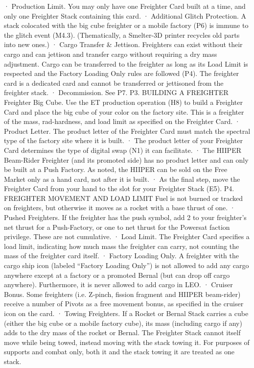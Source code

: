 \documentclass[a4paper]{book}
\begin{document}
·       Production Limit. You may only have one Freighter Card built at a time, and only one Freighter Stack containing this card.
·       Additional Glitch Protection. A stack colocated with the big cube freighter or a mobile factory (P6) is immune to the glitch event (M4.3). (Thematically, a Smelter-3D printer recycles old parts into new ones.)
·       Cargo Transfer \& Jettison. Freighters can exist without their cargo and can jettison and transfer cargo without requiring a dry mass adjustment. Cargo can be transferred to the freighter as long as its Load Limit is respected and the Factory Loading Only rules are followed (P4). The freighter card is a dedicated card and cannot be transferred or jettisoned from the freighter stack.
·      Decommission. See P7.
P3. BUILDING A FREIGHTER
Freighter Big Cube. Use the ET production operation (H8) to build a Freighter Card and place the big cube of your color on the factory site. This is a freighter of the mass, rad-hardness, and load limit as specified on the Freighter Card.
·       Product Letter. The product letter of the Freighter Card must match the spectral type of the factory site where it is built.
·       The product letter of your Freighter Card determines the type of digital swap (N1) it can facilitate.
·       The HIIPER Beam-Rider Freighter (and its promoted side) has no product letter and can only be built at a Push Factory. As noted, the HIIPER can be sold on the Free Market only as a hand card, not after it is built.
·       As the final step, move the Freighter Card from your hand to the slot for your Freighter Stack (E5).
P4. FREIGHTER MOVEMENT AND LOAD LIMIT
Fuel is not burned or tracked on freighters, but otherwise it moves as a rocket with a base thrust of one.
·       Pushed Freighters. If the freighter has the push symbol, add 2 to your freighter’s net thrust for a Push-Factory, or one to net thrust for the Powersat faction privilege. These are not cumulative.
·       Load Limit. The Freighter Card specifies a load limit, indicating how much mass the freighter can carry, not counting the mass of the freighter card itself.
·       Factory Loading Only. A freighter with the cargo ship icon (labeled “Factory Loading Only”) is not allowed to add any cargo anywhere except at a factory or a promoted Bernal (but can drop off cargo anywhere). Furthermore, it is never allowed to add cargo in LEO.
·       Cruiser Bonus. Some freighters (i.e. Z-pinch, fission fragment and HIIPER beam-rider) receive a number of Pivots as a free movement bonus, as specified in the cruiser icon on the card.
·   Towing Freighters. If a Rocket or Bernal Stack carries a cube (either the big cube or a mobile factory cube), its mass (including cargo if any) adds to the dry mass of the rocket or Bernal. The Freighter Stack cannot itself move while being towed, instead moving with the stack towing it. For purposes of supports and combat only, both it and the stack towing it are treated as one stack.
\end{document}
